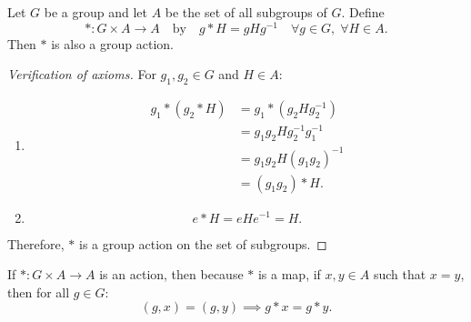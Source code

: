 \begin{example}
Let $G$ be a group and let $A$ be the set of all subgroups of $G$. Define
\[
* : G \times A \longrightarrow A \quad \text{by} \quad g * H = gHg^{-1} \quad \forall g \in G, \; \forall H \in A.
\]
Then $*$ is also a group action.
\begin{proof}[Verification of axioms]
For $g_1, g_2 \in G$ and $H \in A$:
\begin{enumerate}[label=(\roman*)]
    \item 
    \begin{align*}
    g_1 * (g_2 * H) &= g_1 * (g_2 H g_2^{-1}) \\
    &= g_1 g_2 H g_2^{-1} g_1^{-1} \\
    &= g_1 g_2 H (g_1 g_2)^{-1} \\
    &= (g_1 g_2) * H.
    \end{align*}
    \item 
    \[
    e * H = e H e^{-1} = H.
    \]
\end{enumerate}
Therefore, $*$ is a group action on the set of subgroups.
\end{proof}
\end{example}

\begin{remark}
If $* : G \times A \to A$ is an action, then because $*$ is a map, if $x, y \in A$ such that $x = y$, then for all $g \in G$:
\[
(g, x) = (g, y) \implies g * x = g * y.
\]
\end{remark}
